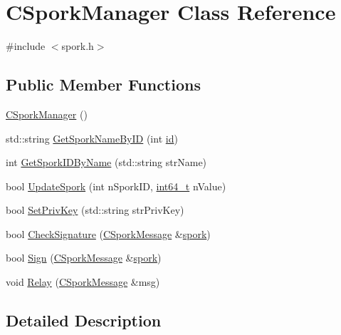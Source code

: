 \hypertarget{class_c_spork_manager}{}\section{C\+Spork\+Manager Class Reference}
\label{class_c_spork_manager}


{\ttfamily \#include $<$spork.\+h$>$}

\subsection*{Public Member Functions}
\begin{DoxyCompactItemize}
\item 
\hyperlink{class_c_spork_manager_af25ba284196ede7288bc9855e7f8a8a5}{C\+Spork\+Manager} ()
\item 
std\+::string \hyperlink{class_c_spork_manager_a1a2960fa69bc49f5e4d36db583d4a840}{Get\+Spork\+Name\+By\+I\+D} (int \hyperlink{db__test_8cc_a7441ef0865bcb3db9b8064dd7375c1ea}{id})
\item 
int \hyperlink{class_c_spork_manager_ae72689cf7a2e87ef57f8f7e875a5c21d}{Get\+Spork\+I\+D\+By\+Name} (std\+::string str\+Name)
\item 
bool \hyperlink{class_c_spork_manager_afb7e15fe29bd548939657a20ca5feafb}{Update\+Spork} (int n\+Spork\+I\+D, \hyperlink{stdint_8h_adec1df1b8b51cb32b77e5b86fff46471}{int64\+\_\+t} n\+Value)
\item 
bool \hyperlink{class_c_spork_manager_a599d088218de9d242e4dc5cb17dd310b}{Set\+Priv\+Key} (std\+::string str\+Priv\+Key)
\item 
bool \hyperlink{class_c_spork_manager_a697d8c0ce5c422ea125eee96687aa7b3}{Check\+Signature} (\hyperlink{class_c_spork_message}{C\+Spork\+Message} \&\hyperlink{rpcserver_8h_ae1217adbb7feda4992da3e630c7e2aea}{spork})
\item 
bool \hyperlink{class_c_spork_manager_adf1b5d40f378c4bd3a5ea31905b11f30}{Sign} (\hyperlink{class_c_spork_message}{C\+Spork\+Message} \&\hyperlink{rpcserver_8h_ae1217adbb7feda4992da3e630c7e2aea}{spork})
\item 
void \hyperlink{class_c_spork_manager_ae8651894670c02ecb5f99806376d5af2}{Relay} (\hyperlink{class_c_spork_message}{C\+Spork\+Message} \&msg)
\end{DoxyCompactItemize}


\subsection{Detailed Description}


